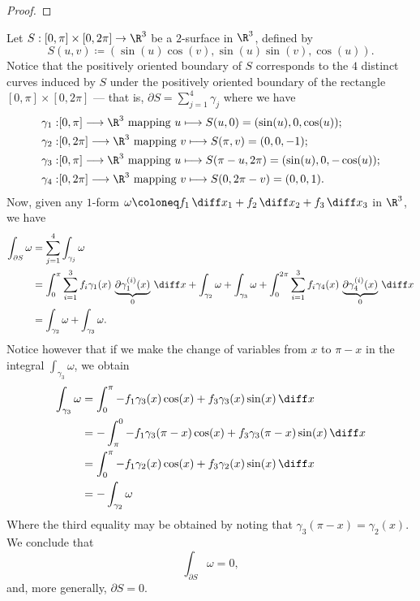 \begin{proof}
\end{proof}

\begin{example}
Let \(S: [0, \pi] \times [0, 2\pi] \to \R^3\) be a \(2\)-surface in \(\R^3\),
defined by
\[
  S(u, v) \coloneq (\sin(u) \cos(v), \sin(u) \sin(v), \cos(u)).
\]
Notice that the positively oriented boundary of \(S\) corresponds to the \(4\)
distinct curves induced by \(S\) under the positively oriented boundary of the
rectangle \([0, \pi] \times [0, 2 \pi]\) --- that is, \(\partial S =
\sum_{j=1}^4 \gamma_j\) where we have
\begin{align*}
  \gamma_1:& [0, \pi] \longrightarrow \R^3
  \text{ mapping } u \longmapsto S(u, 0) = (\sin(u), 0, \cos(u)); \\
  \gamma_2:& [0, 2 \pi] \longrightarrow \R^3
  \text{ mapping } v \longmapsto S(\pi, v) = (0, 0, -1); \\
  \gamma_3:& [0, \pi]\longrightarrow \R^3
  \text{ mapping } u \longmapsto S(\pi - u, 2 \pi) = (\sin(u), 0, -\cos(u)); \\
  \gamma_4:& [0, 2 \pi] \longrightarrow \R^3
  \text{ mapping } v \longmapsto S(0, 2\pi - v) = (0, 0, 1). \\
\end{align*}
Now, given any \(1\)-form \(\omega \coloneq f_1\, \diff x_1 + f_2\, \diff x_2 +
f_3\, \diff x_3\) in \(\R^3\), we have
\begin{align*}
  \int_{\partial S} \omega
  &= \sum_{j=1}^4 \int_{\gamma_j} \omega \\
  &= \int_0^{\pi} \sum_{i=1}^3
    f_i \gamma_1(x)\, \underbrace{\partial \gamma_1^{(i)}(x)}_{0}\, \diff x
  + \int_{\gamma_2} \omega
  + \int_{\gamma_3} \omega
  + \int_0^{2 \pi} \sum_{i=1}^3
    f_i \gamma_4(x)\, \underbrace{\partial \gamma_4^{(i)}(x)}_{0}\, \diff x \\
  &= \int_{\gamma_2} \omega + \int_{\gamma_3} \omega.
\end{align*}
Notice however that if we make the change of variables from \(x\) to \(\pi - x\)
in the integral \(\int_{\gamma_3} \omega\), we obtain
\begin{align*}
  \int_{\gamma_3} \omega
  &= \int_0^{\pi} - f_1 \gamma_3(x) \cos(x) + f_3 \gamma_3(x) \sin(x)\, \diff x
  \\
  &= - \int_{\pi}^0 - f_1\gamma_3(\pi - x) \cos(x) + f_{3} \gamma_{3}(\pi - x)
  \sin(x)\, \diff x
  \\
  &= \int_0^{\pi} -f_1\gamma_2(x) \cos(x) + f_3\gamma_2(x) \sin(x) \, \diff x
  \\
  &= - \int_{\gamma_2} \omega
\end{align*}
Where the third equality may be obtained by noting that \(\gamma_3(\pi - x) =
\gamma_2(x)\). We conclude that
\[
  \int_{\partial S} \omega = 0,
\]
and, more generally, \(\partial S = 0\).
\end{example}


